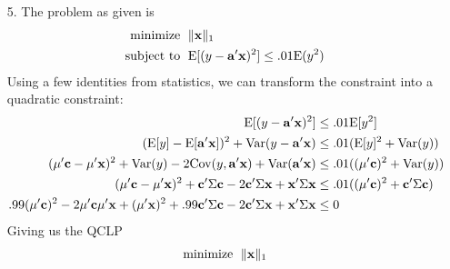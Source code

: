 \documentclass[11pt]{article}
\newcommand{\E}{\mathrm{E}}
\newcommand{\var}{\mathrm{Var}}
\newcommand{\cov}{\mathrm{Cov}}
\theoremstyle{definition}
\begin{document}
\begin{itemize}
\begin{itemize}
\begin{align*}
\begin{array}{cccccccccc}
                                         -0.11&  1.53& -0.50& 2.42& -0.56& -0.37& 0.99& -0.25& -0.18& -0.43]
                                    \end{array} \\
                \end{align*}
            \item[(c)]
                Comparing these two estimates to the original, the LCQP has the smaller relative error:
                \[\frac{\|{\bf x}_{qp}-{\bf x}\|_2}{\|{\bf x}\|_2} = .1538 \]
                while                         
                \[\frac{\|{\bf x}_{ls}-{\bf x}\|_2}{\|{\bf x}\|_2} = .3907 \]
        \end{itemize}

        {\bf Code:} \\
        
    \item[5.] 
        The problem as given is
        \begin{align*}
            \text{minimize    }\; & \|{\bf x}\|_1 \\
            \text{subject to  }\; & \E[(y-{\bf a}'{\bf x})^2]\leq .01 \E(y^2) \\
        \end{align*}
        Using a few identities from statistics, we can transform the constraint into a quadratic constraint:
        \begin{align*}
            \E[(y-{\bf a}'{\bf x})^2] &\leq .01 \E[y^2] \\
            (\E[y]-\E[{\bf a}'{\bf x}])^2 + \var(y-{\bf a}'{\bf x}) &\leq .01 (\E[y]^2+\var(y)) \\
           ({\bf \mu}'{\bf c}-{\bf \mu}'{\bf x})^2 + \var(y)-2\cov(y,{\bf a}'{\bf x})+\var({\bf a}'{\bf x}) &\leq .01 ((\mu'{\bf c})^2+\var(y)) \\
            ({\bf \mu}'{\bf c}-{\bf \mu}'{\bf x})^2 + {\bf c}'\Sigma {\bf c} - 2{\bf c}'\Sigma {\bf x}+ {\bf x}'\Sigma {\bf x} &\leq .01 (({\bf \mu}'{\bf c})^2+{\bf c}'\Sigma {\bf c}) \\
            .99({\bf \mu}'{\bf c})^2 - 2{\bf \mu}'{\bf c}{\bf \mu}'{\bf x} + ({\bf \mu}'{\bf x})^2 + .99{\bf c}'\Sigma {\bf c} - 2{\bf c}'\Sigma {\bf x} + {\bf x}'\Sigma {\bf x} &\leq 0 \\
        \end{align*}
        Giving us the QCLP
        \begin{align*}
            \text{minimize    }\; & \|{\bf x}\|_1 \\

\end{align*}
\end{itemize}
\end{document}
